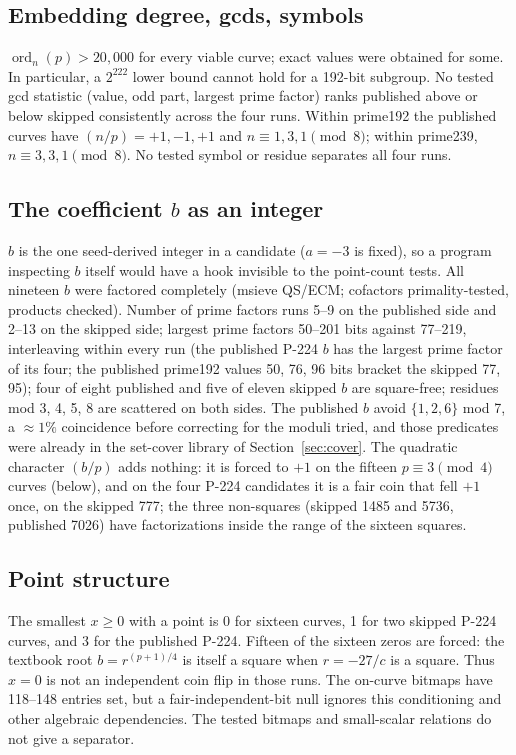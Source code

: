 \documentclass[11pt]{article}
\newcommand{\ord}{\operatorname{ord}}
\begin{document}
\subsection{Embedding degree, gcds, symbols}
$\ord_n(p)>20{,}000$ for every viable curve; exact values were obtained for some. In particular, a $2^{222}$ lower bound cannot hold for a 192-bit subgroup. No tested gcd statistic (value, odd part, largest prime factor) ranks published above or below skipped consistently across the four runs. Within prime192 the published curves have $(n/p)=+1,-1,+1$ and $n\equiv1,3,1\pmod 8$; within prime239, $n\equiv3,3,1\pmod8$. No tested symbol or residue separates all four runs.

\subsection{The coefficient $b$ as an integer}
$b$ is the one seed-derived integer in a candidate ($a=-3$ is fixed), so a program inspecting $b$ itself would have a hook invisible to the point-count tests. All nineteen $b$ were factored completely (msieve QS/ECM; cofactors primality-tested, products checked). Number of prime factors runs 5--9 on the published side and 2--13 on the skipped side; largest prime factors 50--201 bits against 77--219, interleaving within every run (the published P-224 $b$ has the largest prime factor of its four; the published prime192 values 50, 76, 96 bits bracket the skipped 77, 95); four of eight published and five of eleven skipped $b$ are square-free; residues mod 3, 4, 5, 8 are scattered on both sides. The published $b$ avoid $\{1,2,6\}$ mod 7, a $\approx1\%$ coincidence before correcting for the moduli tried, and those predicates were already in the set-cover library of Section~\ref{sec:cover}. The quadratic character $(b/p)$ adds nothing: it is forced to $+1$ on the fifteen $p\equiv3\pmod4$ curves (below), and on the four P-224 candidates it is a fair coin that fell $+1$ once, on the skipped 777; the three non-squares (skipped 1485 and 5736, published 7026) have factorizations inside the range of the sixteen squares.

\subsection{Point structure}
The smallest $x\ge0$ with a point is 0 for sixteen curves, 1 for two skipped P-224 curves, and 3 for the published P-224. Fifteen of the sixteen zeros are forced: the textbook root $b=r^{(p+1)/4}$ is itself a square when $r=-27/c$ is a square. Thus $x=0$ is not an independent coin flip in those runs. The on-curve bitmaps have 118--148 entries set, but a fair-independent-bit null ignores this conditioning and other algebraic dependencies. The tested bitmaps and small-scalar relations do not give a separator.
\end{document}
